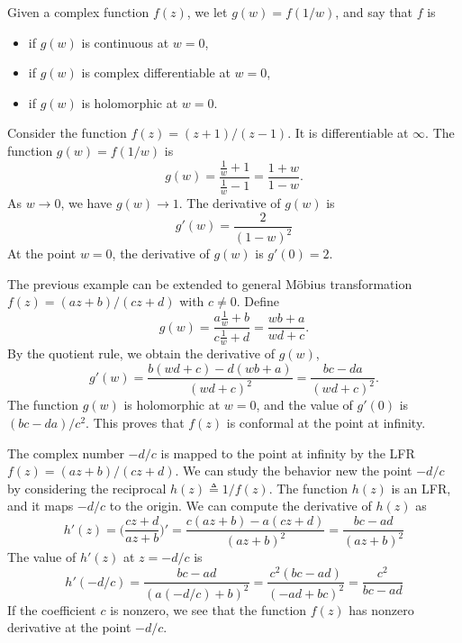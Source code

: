 \begin{svgraybox}
	\begin{definition} 
		\label{def:derivative_at_infinity} 
		Given a complex function $f(z)$, we let $g(w) = f(1/w)$, and say that $f$ is
		\begin{itemize}
			\item  {} if $g(w)$ is continuous at $w=0$,
			\item {} if $g(w) $ is complex differentiable at $w=0$,
			\item {} if $g(w)$ is holomorphic at $w=0$. 
		\end{itemize}
	\end{definition}
\end{svgraybox}

\begin{example}
	Consider the function $f(z) = (z+1)/(z-1)$. It is differentiable at $\infty$. The function $g(w)=f(1/w)$ is
	$$
	g(w) = \frac{\frac{1}{w} + 1}{ \frac{1}{w} - 1} = \frac{1+w}{1-w}.
	$$
	As $w\rightarrow 0$, we have $g(w) \rightarrow 1$.  The derivative of $g(w)$  is
	$$
	g'(w) = \frac{2}{(1-w)^2}
	$$
	At the point $w=0$, the derivative of $g(w)$ is $g'(0)=2$.
\end{example}



The previous example can be extended to general  M\"obius transformation $f(z) = (az+b)/(cz+d)$ with $c\neq 0$. Define 
$$
g(w) = \frac{a\frac{1}{w}+b}{c\frac{1}{w}+d} = \frac{wb+a}{wd+c}.
$$
By the quotient rule, we obtain the derivative of $g(w)$,
$$
g'(w) = \frac{b(wd+c) - d(wb+a)}{(wd+c)^2} =
\frac{bc-da}{(wd+c)^2}.
$$
The function $g(w)$ is holomorphic at $w=0$, and the value of $g'(0)$ is $(bc-da)/c^2$. This proves that $f(z)$ is conformal at the point at infinity.

The complex number  $-d/c$ is mapped to the point at infinity by the LFR $f(z) = (az+b)/(cz+d)$. We can study the behavior new the point $-d/c$ by considering the reciprocal $h(z) \triangleq 1/f(z)$. The function $h(z)$ is an LFR, and it maps $-d/c$ to the origin. We can compute the derivative of $h(z)$ as
$$
h'(z) = \Big( \frac{cz+d}{az+b} \Big)'
= \frac{ c(az+b) - a(cz+d) }{(az+b)^2}
= \frac{bc-ad}{(az+b)^2} 
$$ 
The value of $h'(z)$ at $z=-d/c$ is
$$
h'(-d/c)=\frac{bc-ad}{(a(-d/c)+b)^2} =
\frac{c^2(bc-ad)}{(-ad+bc)^2} = \frac{c^2}{bc-ad}
$$
If the coefficient $c$ is nonzero, we see that the function $f(z)$ has nonzero derivative at the point $-d/c$.


